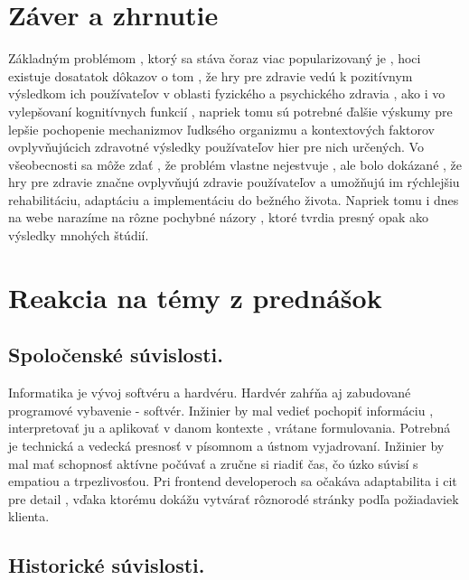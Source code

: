 \documentclass[10pt,oneside,slovak,a4paper]{article}
\begin{document}
\section{Záver a zhrnutie} \label{dolezita}

Základným problémom , ktorý sa stáva čoraz viac popularizovaný je , hoci existuje dosatatok dôkazov o tom , že hry pre zdravie vedú k pozitívnym výsledkom ich používateľov v oblasti fyzického a psychického zdravia , ako i vo vylepšovaní kognitívnych funkcií , napriek tomu sú potrebné ďalšie výskumy pre lepšie pochopenie mechanizmov ľudksého organizmu a kontextových faktorov ovplyvňujúcich zdravotné výsledky používateľov hier pre nich určených. Vo všeobecnosti sa môže zdať , že problém vlastne nejestvuje , ale bolo dokázané , že hry pre zdravie značne ovplyvňujú zdravie používateľov a umožňujú im rýchlejšiu rehabilitáciu, adaptáciu a implementáciu do bežného života. Napriek tomu i dnes na webe narazíme na rôzne pochybné názory , ktoré tvrdia presný opak ako výsledky mnohých štúdií.
\section{Reakcia na témy z prednášok}
\subsection{Spoločenské súvislosti.}
Informatika je vývoj softvéru a hardvéru. Hardvér zahŕňa aj zabudované programové vybavenie - softvér. Inžinier by mal vedieť pochopiť informáciu , interpretovať ju a aplikovať v danom kontexte , vrátane formulovania. Potrebná je technická a vedecká presnosť v písomnom a ústnom vyjadrovaní. Inžinier by mal mať schopnosť aktívne počúvať a zručne si riadiť čas, čo úzko súvisí s empatiou  a trpezlivosťou. Pri frontend developeroch sa očakáva adaptabilita i cit pre detail , vďaka ktorému dokážu vytvárať rôznorodé stránky podľa požiadaviek klienta.
\subsection{Historické súvislosti.}
\end{document}
